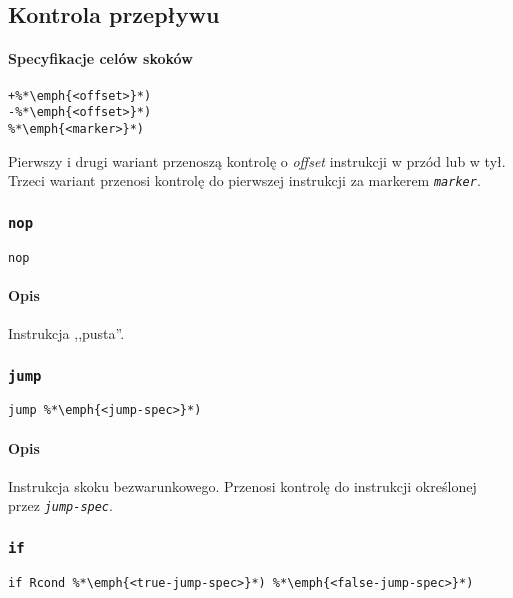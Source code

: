 \subsection{Kontrola przepływu}
\label{viua_vm_ops_control_flow}

\paragraph*{Specyfikacje celów skoków}

\begin{lstlisting}
+%*\emph{<offset>}*)
-%*\emph{<offset>}*)
%*\emph{<marker>}*)
\end{lstlisting}

Pierwszy i drugi wariant przenoszą kontrolę o \emph{offset} instrukcji w przód
lub w tył. Trzeci wariant przenosi kontrolę do pierwszej instrukcji za markerem
\texttt{\emph{marker}}.

\subsubsection{\texttt{nop}}

\begin{lstlisting}
nop
\end{lstlisting}

\paragraph*{Opis} Instrukcja ,,pusta''.

\subsubsection{\texttt{jump}}

\begin{lstlisting}
jump %*\emph{<jump-spec>}*)
\end{lstlisting}

\paragraph*{Opis} Instrukcja skoku bezwarunkowego. Przenosi kontrolę do
instrukcji określonej przez \texttt{\emph{jump-spec}}.

\subsubsection{\texttt{if}}

\begin{lstlisting}
if Rcond %*\emph{<true-jump-spec>}*) %*\emph{<false-jump-spec>}*)
\end{lstlisting}

